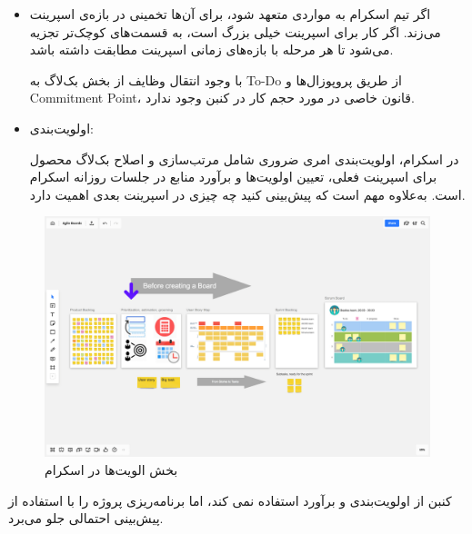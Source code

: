 {\begin{itemize}
اسکرام یوزر استوری را بهترین روش برای تجزیه موارد بزرگ از بک‌لاگ محصول به بک‌لاگ اسپرینت می‌داند. بنابر راهنمای چابک، ویژگی‌ها و وظایف باید همراه با جزئیاتی مانند آزمون‌های پذیرش، طرح‌های رابط کاربری و ... باشند.

کنبن هم از یک روش بک‌لاگ استفاده می‌کند که عموما اما نه الزاما مشابه یک یوزر استوری است.

\item اگر تیم اسکرام به مواردی متعهد شود، برای آن‌ها تخمینی در بازه‌ی اسپرینت می‌زند. اگر کار برای اسپرینت خیلی بزرگ است، به قسمت‌های کوچک‌تر تجزیه می‌شود تا هر مرحله با بازه‌های زمانی اسپرینت مطابقت داشته باشد.

با وجود انتقال وظایف از بخش بک‌لاگ به To-Do از طریق پروپوزال‌ها و Commitment Point، قانون خاصی در مورد حجم کار در کنبن وجود ندارد.

\item اولویت‌بندی:

در اسکرام، اولویت‌بندی امری ضروری شامل مرتب‌سازی و اصلاح بک‌لاگ محصول برای اسپرینت فعلی، تعیین اولویت‌ها و برآورد منابع در جلسات روزانه اسکرام است. به‌علاوه مهم است که پیش‌بینی کنید چه چیزی در اسپرینت بعدی اهمیت دارد.
\end{itemize}
    
\begin{figure}
	\centering
	\includegraphics[scale=0.3]{figs/4-2-c}
	\caption{بخش الویت‌ها در اسکرام}
\end{figure}

کنبن از اولویت‌بندی و برآورد استفاده نمی کند، اما برنامه‌ریزی پروژه را با استفاده از پیش‌بینی احتمالی جلو می‌برد.

}
